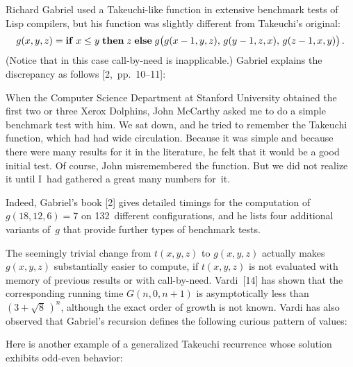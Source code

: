 Richard Gabriel used a Takeuchi-like function in extensive benchmark tests of
 Lisp compilers, but his function was slightly different from
Takeuchi's original:
$$g(x,y,z)={\bf if}\;x\leq y\;{\bf then}\;z\;{\bf else}\;
g\bigl(g(x-1,y,z),\,g(y-1,z,x),\,g(z-1,x,y)\bigr)\,.$$
(Notice that in this case call-by-need is inapplicable.) Gabriel
explains the discrepancy as follows [2,~pp.\ 10--11]:

{\narrower\smallskip\noindent
When the Computer Science Department at Stanford University obtained
the first two or three Xerox Dolphins, John McCarthy asked me to do a
simple benchmark test with him. We sat down, and he tried to remember
the Takeuchi function, which had had wide circulation. Because it was
simple and because there were many results for it in the literature,
he felt that it would be a good initial test. Of course, John
misremembered the function. But we did not realize it until I~had
gathered a great many numbers for~it.
\smallskip}

\noindent
Indeed, Gabriel's book [2] gives detailed timings for the
computation of $g(18,12,6)=7$ on 132~different configurations, and he
lists four additional variants of~$g$ that provide further types of
benchmark tests.

The seemingly trivial change from $t(x,y,z)$ to $g(x,y,z)$ actually
makes $g(x,y,z)$ substantially easier to compute, if $t(x,y,z)$ is not
evaluated with memory of previous results or with call-by-need. Vardi~[14]
 has shown that the corresponding running time $G(n,0,n+1)$ is
asymptotically less than $(3+\sqrt{8}\,)^n$, although the exact
order of growth is not known.
Vardi has also observed that Gabriel's recursion defines the following
curious pattern of values:

\smallskip
{}

Here is another example of a generalized Takeuchi recurrence whose
solution  exhibits odd-even behavior:

\smallskip
{}


